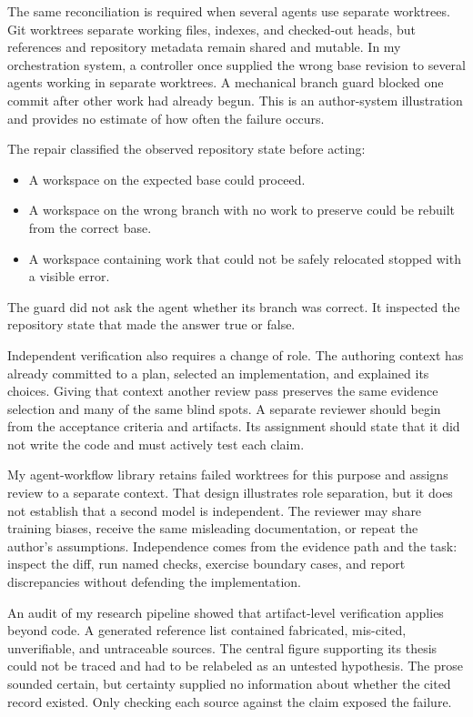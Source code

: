 The same reconciliation is required when several agents use separate worktrees. Git worktrees separate working files, indexes, and checked-out heads, but references and repository metadata remain shared and mutable. In my orchestration system, a controller once supplied the wrong base revision to several agents working in separate worktrees. A mechanical branch guard blocked one commit after other work had already begun. This is an author-system illustration and provides no estimate of how often the failure occurs.

The repair classified the observed repository state before acting:

\begin{itemize}
\tightlist
\item
  A workspace on the expected base could proceed.
\item
  A workspace on the wrong branch with no work to preserve could be rebuilt from the correct base.
\item
  A workspace containing work that could not be safely relocated stopped with a visible error.
\end{itemize}

The guard did not ask the agent whether its branch was correct. It inspected the repository state that made the answer true or false.

Independent verification also requires a change of role. The authoring context has already committed to a plan, selected an implementation, and explained its choices. Giving that context another review pass preserves the same evidence selection and many of the same blind spots. A separate reviewer should begin from the acceptance criteria and artifacts. Its assignment should state that it did not write the code and must actively test each claim.

My agent-workflow library retains failed worktrees for this purpose and assigns review to a separate context. That design illustrates role separation, but it does not establish that a second model is independent. The reviewer may share training biases, receive the same misleading documentation, or repeat the author's assumptions. Independence comes from the evidence path and the task: inspect the diff, run named checks, exercise boundary cases, and report discrepancies without defending the implementation.

An audit of my research pipeline showed that artifact-level verification applies beyond code. A generated reference list contained fabricated, mis-cited, unverifiable, and untraceable sources. The central figure supporting its thesis could not be traced and had to be relabeled as an untested hypothesis. The prose sounded certain, but certainty supplied no information about whether the cited record existed. Only checking each source against the claim exposed the failure.


